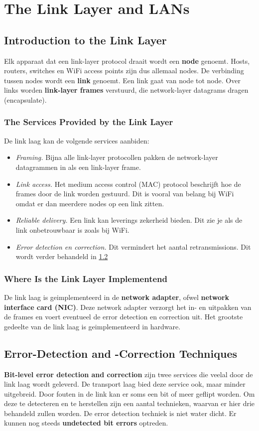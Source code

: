 \section{The Link Layer and LANs}
\subsection{Introduction to the Link Layer}
Elk apparaat dat een link-layer protocol draait wordt een \textbf{node} genoemt. Hosts, routers, switches en WiFi access points zijn dus allemaal nodes.
De verbinding tussen nodes wordt een \textbf{link} genoemt. Een link gaat van node tot node.
Over links worden \textbf{link-layer frames} verstuurd, die network-layer datagrams dragen (encapsulate).
\subsubsection{The Services Provided by the Link Layer}
De link laag kan de volgende services aanbiden:
\begin{itemize}
	\item \textit{Framing.} Bijna alle link-layer protocollen pakken de network-layer datagrammen in als een link-layer frame.
	\item \textit{Link access.} Het medium access control (MAC) protocol beschrijft hoe de frames door de link worden gestuurd. 
	Dit is vooral van belang bij WiFi omdat er dan meerdere nodes op een link zitten.
	\item \textit{Reliable delivery.} Een link kan leverings zekerheid bieden. Dit zie je als de link onbetrouwbaar is zoals bij WiFi.
	\item \textit{Error detection en correction.} Dit vermindert het aantal retransmissions. Dit wordt verder behandeld in \ref{EDC}
\end{itemize}
\subsubsection{Where Is the Link Layer Implementend}
De link laag is geimplementeerd in de \textbf{network adapter}, ofwel \textbf{network interface card (NIC)}. 
Deze network adapter verzorgt het in- en uitpakken van de frames en voert eventueel de error detection en correction uit.
Het grootste gedeelte van de link laag is geimplementeerd in hardware.


\subsection{Error-Detection and -Correction Techniques} \label{EDC}
\textbf{Bit-level error detection and correction} zijn twee services die veelal door de link laag wordt geleverd. De transport laag bied deze service ook, maar minder uitgebreid.
Door fouten in de link kan er soms een bit of meer geflipt worden. Om deze te detecteren en te herstellen zijn een aantal technieken, waarvan er hier drie behandeld zullen worden. De error detection techniek is niet water dicht. Er kunnen nog steeds \textbf{undetected bit errors} optreden.

